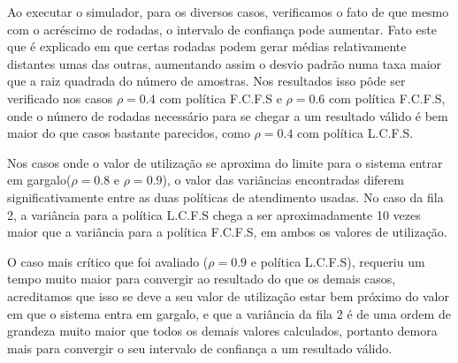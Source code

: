 Ao executar o simulador, para os diversos casos, verificamos o fato de que mesmo com o acréscimo de rodadas, o intervalo de confiança pode aumentar. Fato este que é explicado em que certas rodadas podem gerar médias relativamente distantes umas das outras, aumentando assim o desvio padrão numa taxa maior que a raiz quadrada do número de amostras. Nos resultados isso pôde ser verificado nos casos $\rho=0.4$ com política F.C.F.S e $\rho=0.6$ com política F.C.F.S, onde o número de rodadas necessário para se chegar a um resultado válido é bem maior do que casos bastante parecidos, como $\rho=0.4$ com política L.C.F.S.

Nos casos onde o valor de utilização se aproxima do limite para o sistema entrar em gargalo($\rho=0.8$ e $\rho=0.9$), o valor das variâncias encontradas diferem significativamente entre as duas políticas de atendimento usadas. No caso da fila 2, a variância para a política L.C.F.S chega a ser aproximadamente 10 vezes maior que a variância para a política F.C.F.S, em ambos os valores de utilização.

O caso mais crítico que foi avaliado ($\rho=0.9$ e política L.C.F.S), requeriu um tempo muito maior para convergir ao resultado do que os demais casos, acreditamos que isso se deve a seu valor de utilização estar bem próximo do valor em que o sistema entra em gargalo, e que a variância da fila 2 é de uma ordem de grandeza muito maior que todos os demais valores calculados, portanto demora mais para convergir o seu intervalo de confiança a um resultado válido.
